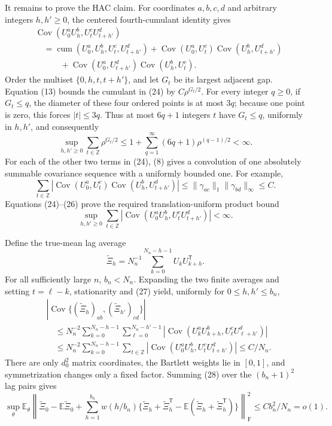 It remains to prove the HAC claim.  For coordinates \(a,b,c,d\) and arbitrary integers \(h,h'\geq0\), the centered fourth-cumulant identity gives
\[
 \begin{aligned}
 &\operatorname{Cov}(U_0^aU_h^b,U_t^cU_{t+h'}^d)\\
 &\quad=\operatorname{cum}(U_0^a,U_h^b,U_t^c,U_{t+h'}^d)
 +\operatorname{Cov}(U_0^a,U_t^c)\operatorname{Cov}(U_h^b,U_{t+h'}^d)\\
 &\qquad\quad
 +\operatorname{Cov}(U_0^a,U_{t+h'}^d)\operatorname{Cov}(U_h^b,U_t^c).
 \end{aligned}
\tag{24}
\]
Order the multiset \(\{0,h,t,t+h'\}\), and let \(G_t\) be its largest adjacent gap.  Equation (13) bounds the cumulant in (24) by \(C\rho^{G_t/2}\).  For every integer \(q\geq0\), if \(G_t\leq q\), the diameter of these four ordered points is at most \(3q\); because one point is zero, this forces \(|t|\leq3q\).  Thus at most \(6q+1\) integers \(t\) have \(G_t\leq q\), uniformly in \(h,h'\), and consequently
\[
 \sup_{h,h'\geq0}\sum_{t\in\mathbb Z}\rho^{G_t/2}
 \leq 1+\sum_{q=1}^\infty(6q+1)\rho^{(q-1)/2}<\infty.
\tag{25}
\]
For each of the other two terms in (24), (8) gives a convolution of one absolutely summable covariance sequence with a uniformly bounded one.  For example,
\[
 \sum_{t\in\mathbb Z}
 |\operatorname{Cov}(U_0^a,U_t^c)
   \operatorname{Cov}(U_h^b,U_{t+h'}^d)|
 \leq
 \lVert\gamma_{ac}\rVert_1\lVert\gamma_{bd}\rVert_\infty\leq C.
\tag{26}
\]
Equations (24)--(26) prove the required translation-uniform product bound
\[
 \sup_{h,h'\geq0}\sum_{t\in\mathbb Z}
 |\operatorname{Cov}(U_0^aU_h^b,U_t^cU_{t+h'}^d)|<\infty.
\tag{27}
\]

Define the true-mean lag average
\[
 \widetilde\Xi_h=N_n^{-1}\sum_{k=0}^{N_n-h-1}U_kU_{k+h}^{\mathsf T}.
\]
For all sufficiently large \(n\), \(b_n<N_n\).  Expanding the two finite averages and setting \(t=\ell-k\), stationarity and (27) yield, uniformly for \(0\leq h,h'\leq b_n\),
\[
 \begin{aligned}
 &\left|\operatorname{Cov}\{(\widetilde\Xi_h)_{ab},
                         (\widetilde\Xi_{h'})_{cd}\}\right|\\
 &\quad\leq N_n^{-2}\sum_{k=0}^{N_n-h-1}
       \sum_{\ell=0}^{N_n-h'-1}
       |\operatorname{Cov}(U_k^aU_{k+h}^b,U_\ell^cU_{\ell+h'}^d)|\\
 &\quad\leq N_n^{-2}\sum_{k=0}^{N_n-h-1}
       \sum_{t\in\mathbb Z}
       |\operatorname{Cov}(U_0^aU_h^b,U_t^cU_{t+h'}^d)|
 \leq C/N_n.
 \end{aligned}
\tag{28}
\]
There are only \(d_0^2\) matrix coordinates, the Bartlett weights lie in \([0,1]\), and symmetrization changes only a fixed factor.  Summing (28) over the \((b_n+1)^2\) lag pairs gives
\[
 \sup_\theta\mathbb E_\theta\left\lVert
 \widetilde\Xi_0-\mathbb E\widetilde\Xi_0
 +\sum_{h=1}^{b_n}w(h/b_n)
 \{\widetilde\Xi_h+\widetilde\Xi_h^{\mathsf T}
   -\mathbb E(\widetilde\Xi_h+\widetilde\Xi_h^{\mathsf T})\}
 \right\rVert_{\mathrm F}^2
 \leq Cb_n^2/N_n=o(1).
\tag{29}
\]

